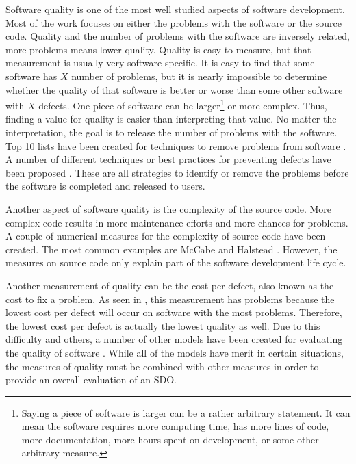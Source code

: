\documentclass[SDSUThesis.tex]{subfiles}
\begin{document}
    Software quality is one of the most well studied aspects
    of software development.  Most of the work focuses on
    either the problems with the software or the source code.
    Quality and the number of problems with the software
    are inversely related, more problems means lower quality. 
    Quality is easy to measure, but 
    that measurement is usually very software specific.  It is easy
    to find that some software has $X$ number of problems, but
    it is nearly impossible to determine whether the quality
    of that software is better or worse than some other software
    with $X$ defects.  One piece of software can be 
    larger\footnote{Saying a piece of software is larger can be a 
    rather arbitrary statement.  It can mean the software requires 
    more computing time, has more lines of code, more documentation, 
    more hours spent on development, or some other arbitrary measure.}
    or more complex.  Thus, finding a value for quality is easier 
    than interpreting that value.  No matter the interpretation,
    the goal is to release the number of problems with the software.
    Top 10 lists have been created for techniques to remove problems
    from software \cite{Boehm2001}.  
    A number of different techniques or best practices
    for preventing defects have 
    been proposed \cite{Faizan2012}.  These are all strategies to identify
    or remove the problems before the software is completed and released
    to users.  
    
    Another aspect of software quality is the complexity of the 
    source code.  More complex code results in more maintenance efforts and
    more chances for problems. A couple of numerical measures for the 
    complexity of source code have been created.  The most common examples
    are McCabe \cite{McCabe1976} and Halstead \cite{Halstead1977}.
    However, the measures on source code only explain part of the 
    software development life cycle.  
    
    Another measurement of quality can be the cost per defect, also 
    known as the cost to fix a problem.  As seen in \cite{Jones2013},
    this measurement has problems because the lowest cost per
    defect will occur on software with the most problems.  Therefore,
    the lowest cost per defect is actually the lowest quality as well.
    Due to this difficulty and others, a number of other models
    have been created for evaluating the quality of software 
    \cite{Miguel2014}.  While all of the models have merit
    in certain situations, the measures of quality must be combined
    with other measures in order to provide an overall evaluation
    of an SDO.
    
\end{document}
